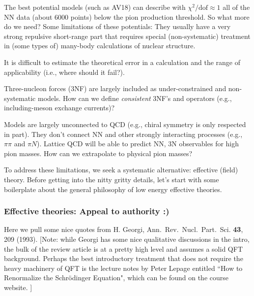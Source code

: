    The best potential models (such as AV18) can describe with $\chi^2/\mbox{dof}
    \approx 1$ all of the NN data (about 6000 points) below the
    pion production threshold.  So what more do we need?  
  Some limitations of these potentials:
   \bi
    \I They usually have a very strong repulsive short-range part
     that requires special (non-systematic) treatment in 
     (some types of) many-body calculations of nuclear structure.
     
     \I It is difficult to estimate the theoretical error in a calculation
       and the range of applicability (i.e., where should it fail?).
     
     \I Three-nucleon forces (3NF) are largely included as
     under-constrained and non-systematic models.  How can we define 
     \emph{consistent} 3NF's
     and operators (e.g., including-meson exchange currents)?
     
     \I Models are largely unconnected to QCD (e.g., chiral
     symmetry is only respected in part).  They don't connect
     NN and other strongly interacting processes (e.g., $\pi\pi$
     and $\pi N$).  
%     
     Lattice QCD will be able to predict NN, 3N observables for 
     high pion masses.  How can we extrapolate to physical pion masses?

   \ei
   To address these limitations, we seek a systematic alternative: effective (field) theory. Before getting into the nitty gritty details, let's start with some boilerplate about the general philosophy of low energy effective theories.
    

  \subsubsection{Effective theories: Appeal to authority :)}

Here we pull some nice quotes from H. Georgi, 
Ann.\ Rev.\ Nucl.\ Part.\ Sci. \textbf{43}, 209 (1993). [Note: while Georgi has some nice qualitative discussions in the intro, the bulk of the review article is at a pretty high level and assumes a solid QFT background.  Perhaps the best introductory treatment that does not require the heavy machinery of QFT is the lecture notes by Peter Lepage entitled ``How to Renormalize the Schr\"odinger Equation", which can be found on the course website. ]

